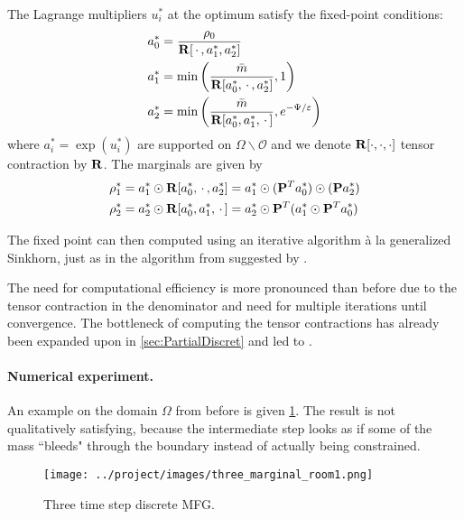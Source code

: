 \documentclass[../report.tex]{subfiles}
\begin{document}
\begin{prop}
The Lagrange multipliers $u_i^*$ at the optimum satisfy the fixed-point conditions:
\begin{align*}
	&a_0^* = \frac{\rho_0}{\mathbf{R}[\,\cdot\,, a_1^*, a_2^*]} \\
	&a_1^* = \min\left(
	\frac{\bar{m}}{\mathbf{R}[a_0^*, \,\cdot\,, a_2^*]}, 1\right) \\
	&a_2^* = \min\left(
	\frac{\bar{m}}{\mathbf{R}[a_0^*, a_1^*, \,\cdot\,]}, e^{-\Psi/\varepsilon}
	\right)
\end{align*}
where $a_i^* = \exp(u_i^*)$ are supported on $\Omega\backslash\mathscr{O}$ and we denote $\mathbf{R}[\cdot,\cdot,\cdot]$ tensor contraction by $\mathbf{R}$.
The marginals are given by
\[
\begin{aligned}
	\rho_1^* &=
	a_1^* \odot
	\mathbf{R}[a_0^*, \,\cdot\,, a_2^*] =
	a_1^* \odot
	(\mathbf{P}^Ta_0^*) \odot
	(\mathbf{P}a_2^*) \\
	\rho_2^* &= 
	a_2^* \odot \mathbf{R}[a_0^*, a_1^*, \,\cdot\,]
	= a_2^* \odot
	\mathbf{P}^T
	(a_1^* \odot \mathbf{P}^Ta_0^*)
\end{aligned}
\]
\end{prop}



The fixed point can then computed using an iterative algorithm à la generalized Sinkhorn, just as in the algorithm from  suggested by \cite{benamou2018entropy}.

The need for computational efficiency is more pronounced than before due to the tensor contraction in the denominator and need for multiple iterations until convergence. The bottleneck of computing the tensor contractions has already been expanded upon in \cref{sec:PartialDiscret} and led to .

\paragraph{Numerical experiment.} An example on the domain $\Omega$ from before is given \cref{fig:3MargTransport}. The result is not qualitatively satisfying, because the intermediate step looks as if some of the mass ``bleeds" through the boundary instead of actually being constrained.

\begin{figure}[h]
	\centering
	\texttt{[image: ../project/images/three\_marginal\_room1.png]}
	\caption{Three time step discrete MFG.}\label{fig:3MargTransport}
\end{figure}
\end{document}
